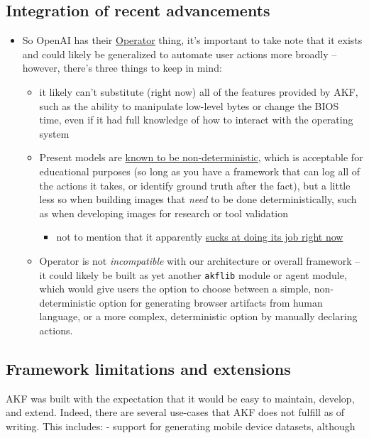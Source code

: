 \subsection{Integration of recent
advancements}\label{integration-of-recent-advancements}

\begin{itemize}
\tightlist
\item
  So OpenAI has their
  \href{https://openai.com/index/introducing-operator/}{Operator} thing,
  it's important to take note that it exists and could likely be
  generalized to automate user actions more broadly -- however, there's
  three things to keep in mind:

  \begin{itemize}
  \tightlist
  \item
    it likely can't substitute (right now) all of the features provided
    by AKF, such as the ability to manipulate low-level bytes or change
    the BIOS time, even if it had full knowledge of how to interact with
    the operating system
  \item
    Present models are
    \href{https://152334h.github.io/blog/non-determinism-in-gpt-4/}{known
    to be non-deterministic}, which is acceptable for educational
    purposes (so long as you have a framework that can log all of the
    actions it takes, or identify ground truth after the fact), but a
    little less so when building images that \emph{need} to be done
    deterministically, such as when developing images for research or
    tool validation

    \begin{itemize}
    \tightlist
    \item
      not to mention that it apparently
      \href{https://www.reddit.com/r/ChatGPTPro/comments/1i8jln3/i_am_among_the_first_people_to_gain_access_to/}{sucks
      at doing its job right now}
    \end{itemize}
  \item
    Operator is not \emph{incompatible} with our architecture or overall
    framework -- it could likely be built as yet another \texttt{akflib}
    module or agent module, which would give users the option to choose
    between a simple, non-deterministic option for generating browser
    artifacts from human language, or a more complex, deterministic
    option by manually declaring actions.
  \end{itemize}
\end{itemize}

\subsection{Framework limitations and
extensions}\label{framework-limitations-and-extensions}

AKF was built with the expectation that it would be easy to maintain,
develop, and extend. Indeed, there are several use-cases that AKF does
not fulfill as of writing. This includes: - support for generating
mobile device datasets, although
